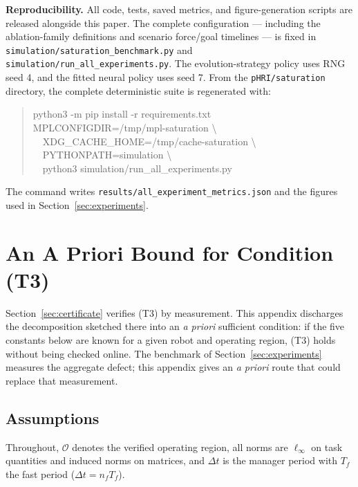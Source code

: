 \documentclass[journal]{IEEEtran}
\begin{document}
\textbf{Reproducibility.} All code, tests, saved metrics, and figure-generation scripts are released alongside this paper. The complete configuration --- including the ablation-family definitions and scenario force/goal timelines --- is fixed in \texttt{simulation/saturation\_benchmark.py} and \texttt{simulation/run\_all\_experiments.py}. The evolution-strategy policy uses RNG seed 4, and the fitted neural policy uses seed 7. From the \texttt{pHRI/saturation} directory, the complete deterministic suite is regenerated with:
\begin{quote}
\scriptsize\ttfamily
python3 -m pip install -r requirements.txt\\
MPLCONFIGDIR=/tmp/mpl-saturation \textbackslash\\
\ \ XDG\_CACHE\_HOME=/tmp/cache-saturation \textbackslash\\
\ \ PYTHONPATH=simulation \textbackslash\\
\ \ python3 simulation/run\_all\_experiments.py
\end{quote}
The command writes \texttt{results/\allowbreak all\_experiment\_\allowbreak metrics.json}
and the figures used in Section~\ref{sec:experiments}.

\balance

\section{An A Priori Bound for Condition (T3)}
\label{app:t3bound}

Section~\ref{sec:certificate} verifies (T3) by measurement. This appendix
discharges the decomposition sketched there into an \emph{a priori} sufficient
condition: if the five constants below are known for a given robot and
operating region, (T3) holds without being checked online. The benchmark of
Section~\ref{sec:experiments} measures the aggregate defect; this appendix
gives an \emph{a priori} route that could replace that measurement.

\subsection{Assumptions}

Throughout, $\mathcal O$ denotes the verified operating region, all norms are
$\ell_\infty$ on task quantities and induced norms on matrices, and $\Delta t$
is the manager period with $T_f$ the fast period ($\Delta t=n_fT_f$).
\end{document}
